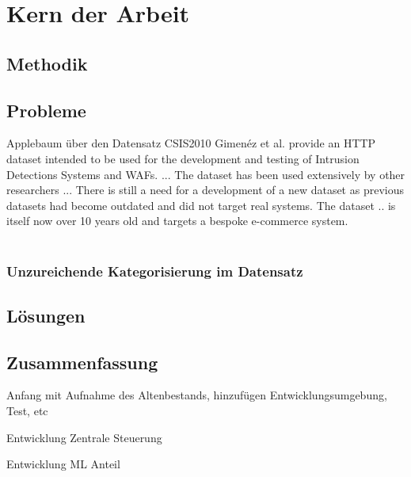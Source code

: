 \chapter{Kern der Arbeit}



\section{Methodik}

\section{Probleme}

\textcolor{bhtGray}{ Applebaum über den Datensatz CSIS2010\cite{Applebaum2021}} Gimenéz et al. provide an HTTP dataset intended to be used for the development and testing of Intrusion Detections Systems and WAFs. ... The dataset has been used extensively by other researchers ... There is still a need for a development of a new dataset as previous datasets had become outdated and did not target real systems. The dataset .. is itself now over 10 years old and targets a bespoke e-commerce system. \\\\


\subsection{Unzureichende Kategorisierung im Datensatz}

\section{Lösungen}




\section{Zusammenfassung}

\begin{neu}
  Anfang mit Aufnahme des Altenbestands, hinzufügen Entwicklungsumgebung, Test, etc

  Entwicklung Zentrale Steuerung

  Entwicklung ML Anteil
\end{neu}